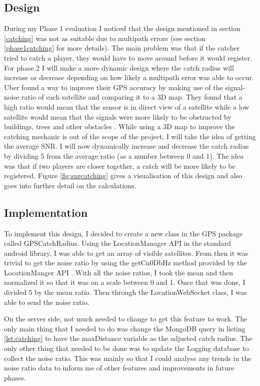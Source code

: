 \documentclass{l4proj}
\begin{document}
\subsection{Design}
\label{phase2catchingdesign}
During my Phase 1 evaluation I noticed that the design mentioned in section \ref{catching} was not as suitable due to 
multipath errors (see section \ref{phase1catching} for more details). The main problem was that if the catcher tried
to catch a player, they would have to move around before it would register. For phase 2 I will make a more dynamic design
where the catch radius will increase or decrease depending on how likely a multipath error was able to occur. Uber found
a way to improve their GPS accuracy by making use of the signal-noise ratio of each satellite and comparing it to a 3D map.
They found that a high ratio would mean that the sensor is in direct view of a satellite while a low satellite would mean that
the signals were more likely to be obstructed by buildings, trees and other obstacles \citep{uberGPS}. While using a 3D map
to improve the catching mechanic is out of the scope of the project, I will take the idea of getting the average SNR. I will
now dynamically increase and decrease the catch radius by dividing 5 from the average ratio (as a number between 0 and 1). The idea
was that if two players are closer together, a catch will be more likely to be registered. Figure \ref{fig:snrcatching} gives a
visualisation of this design and also goes into further detail on the calculations.

\subsection{Implementation}
To implement this design, I decided to create a new class in the GPS package called GPSCatchRadius. Using the LocationManager API in the standard
android library, I was able to get an array of visible satellites. From then it was trivial to
get the noise ratio by using the getCn0DbHz method provided by the LocationManger API \citep{locationManager}. With all
the noise ratios, I took the mean and then normalized it so that it was on a scale between 0 and 1. Once that was done,
I divided 5 by the mean ratio. Then through the LocationWebSocket class, I was able to send the noise ratio.

On the server side, not much needed to change to get this feature to work. The only main thing that I needed to
do was change the MongoDB query in listing \ref{lst:catching} to have the maxDistance variable as the adjusted catch radius. The
only other thing that needed to be done was to update the Logging database to collect the noise ratio. This was mainly
so that I could analyse any trends in the noise ratio data to inform me of other features and improvements
in future phases.
\end{document}
